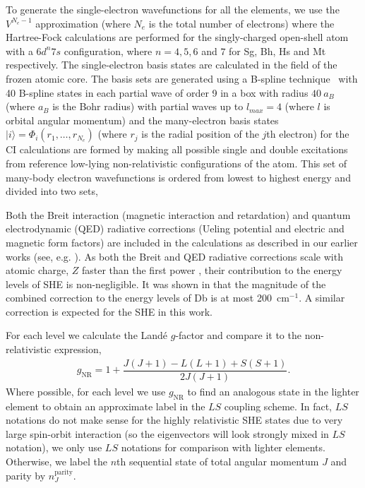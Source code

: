 \documentclass[10pt,a4paper, twoside]{report}
\begin{document}
To generate the single-electron wavefunctions for all the elements,  we use the $V^{N_e-1}$ approximation (where $N_e$ is the total number of electrons) \cite{Kelly1964, Dzuba2005} where the Hartree-Fock calculations are performed for the singly-charged open-shell atom with a   $6d^n7s$ configuration, where $n=4,5,6$ and $7$ for Sg, Bh, Hs and Mt respectively. The  single-electron basis states are calculated in the field of the frozen atomic core. The basis sets are generated using a  B-spline technique~\cite{Johnson1988}  with 40 B-spline states in each partial wave of order 9 in a box with radius $40 \ a_B$ (where $a_B$ is the Bohr radius) with partial waves up to $l_{max}=4$ (where $l$ is orbital angular momentum) and the many-electron basis states $|i \rangle = \Phi_i(r_1,\dots,r_{N_e})$ (where $r_j$ is the radial position of the $j$th electron)  for the CI calculations are formed by making all possible single and double excitations from reference low-lying non-relativistic configurations of the atom. This set of many-body electron wavefunctions is ordered from lowest to highest energy and divided into two sets, 


Both the Breit interaction (magnetic interaction and retardation)\cite{Breit1929, Mann1971}  and quantum electrodynamic (QED) radiative corrections  (Ueling potential and electric and magnetic form factors) \cite{FG2005} are included in the calculations as described in our earlier works (see, e.g. \cite{FF113-115}).  As both the Breit and QED radiative corrections scale with atomic charge, $Z$ faster than the first power \cite{FF113-115}, their contribution to the energy levels of SHE is non-negligible. It was shown in \cite{LDFDb2018} that the magnitude of the combined correction to the energy levels of Db is at most  200~cm$^{-1}$.  A similar correction is expected for the SHE in this work.

For each level we calculate the Land\'{e} $g$-factor and compare it to the non-relativistic expression,
\begin{align} \label{eq:Lande}
g_{\text{NR}} =  1 + \dfrac{J(J + 1) - L(L+1) + S(S+1)}{2J(J+1)}.
\end{align}
Where possible, for each level we use $g_{\text{NR}}$ to find an analogous state in the lighter element to obtain an approximate label in the $LS$ coupling scheme. In fact, $LS$ notations do not make sense for the highly relativistic SHE states due to very large spin-orbit interaction (so the eigenvectors will look strongly mixed in $LS$ notation), we only use $LS$ notations for comparison with lighter elements. Otherwise, we label the $n$th sequential state of total angular momentum $J$ and parity by $n_{J}^{\text{parity}}$.
\end{document}

